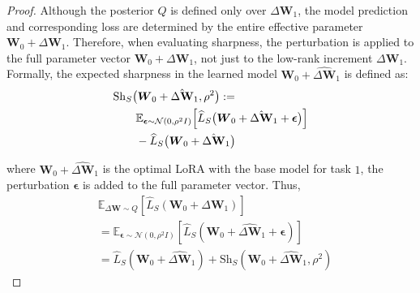 \documentclass[letterpaper]{article} %
\begin{document}
\begin{proof}
Although the posterior $Q$ is defined only over $\Delta\boldsymbol{W}_1$, the model prediction and corresponding loss are determined by the entire effective parameter $\boldsymbol{W}_0 + \Delta\boldsymbol{W}_1$. Therefore, when evaluating sharpness, the perturbation is applied to the full parameter vector $\boldsymbol{W}_0 + \Delta\boldsymbol{W}_1$, not just to the low-rank increment $\Delta\boldsymbol{W}_1$. Formally, the expected sharpness in the learned model $\boldsymbol{W}_0 + \hat{\Delta\boldsymbol{W}}_1$ is defined as:
\begin{equation}
\begin{aligned}
&\mathrm{Sh}_S\big(\boldsymbol{W}_0 + \hat{\Delta\mathbf{W}}_1, \rho^2\big) := \\
& \qquad \mathbb{E}_{\boldsymbol{\epsilon} \sim \mathcal{N}(0, \rho^2 I)} \Big[
    \widehat{L}_S\big(\boldsymbol{W}_0 + \hat{\Delta\mathbf{W}}_1 + \boldsymbol{\epsilon}\big)
\Big]  \\
& \qquad- \widehat{L}_S\big(\boldsymbol{W}_0 + \hat{\Delta\mathbf{W}}_1\big) 
\notag
\end{aligned}
\end{equation}

where $\boldsymbol{W}_0 +\hat{\Delta\boldsymbol{W}}_1$ is the optimal LoRA with the base model for task $1$, the perturbation $\boldsymbol{\epsilon}$ is added to the full parameter vector. Thus,
\begin{equation}
    \begin{aligned}
    &\mathbb{E}_{\Delta\mathbf{W} \sim Q}[\widehat{L}_S(\mathbf{W}_0 + \Delta\mathbf{W}_1)] \\
    &= \mathbb{E}_{\boldsymbol{\epsilon} \sim \mathcal{N}(0, \rho^2 I)}[\widehat{L}_S(\mathbf{W}_0 + \hat{\Delta\mathbf{W}}_1 + \boldsymbol{\epsilon})]  \\
    &=\widehat{L}_S(\mathbf{W}_0 + \hat{\Delta\mathbf{W}}_1) + \mathrm{Sh}_S(\mathbf{W}_0+\hat{\Delta\mathbf{W}}_1, \rho^2)
\end{aligned}
\end{equation}


\end{proof}
\end{document}
